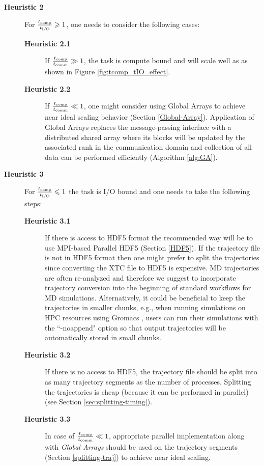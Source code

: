 \begin{description}
\item[\textbf{Heuristic 2}] For $\frac{{t}_{\text{comp}}}{{t}_{\text{I/O}}} \geqslant 1$, one needs to consider the following cases: 
  \begin{description}
  \item[\textbf{Heuristic 2.1}] If $\frac{{t}_{\text{comp}}}{t_{\text{comm}}} \gg 1$, the task is compute bound and will scale well as as shown in Figure \ref{fig:tcomp_tIO_effect}.
  \item[\textbf{Heuristic 2.2}] If $\frac{{t}_{\text{comp}}}{t_{\text{comm}}} \ll 1$, one might consider using Global Arrays to achieve near ideal scaling behavior (Section \ref{Global-Array}).  Application of Global Arrays replaces the message-passing interface with a distributed shared array where its blocks will be updated by the associated rank in the communication domain and collection of all data can be performed efficiently (Algorithm \ref{alg:GA}).
  \end{description}
\item[\textbf{Heuristic 3}] For $\frac{{t}_{\text{comp}}}{{t}_{\text{I/O}}} \leqslant 1$ the task is I/O bound and one needs to take the following steps:  
  \begin{description}
    \item[\textbf{Heuristic 3.1}] If there is access to HDF5 format the recommended way will be to use MPI-based Parallel HDF5 (Section \ref{HDF5}). If the trajectory file is not in HDF5 format then one might prefer to split the trajectories since converting the XTC file to HDF5 is expensive. MD trajectories are often re-analyzed and therefore we suggest to incorporate trajectory conversion into the beginning of standard workflows for MD simulations. 
 Alternatively, it could be beneficial to keep the trajectories in smaller chunks, e.g., when running simulations on HPC resources using Gromacs \cite{Gromacs3, Gromacs1}, users can run their simulations with the ``-noappend" option so that output trajectories  will be automatically stored in small chunks.
    \item[\textbf{Heuristic 3.2}] If there is no access to HDF5, the trajectory file should be split into as many trajectory segments as the number of processes. Splitting the trajectories is cheap (because it can be performed in parallel) (see Section \ref{sec:splitting-timing}).
    \item[\textbf{Heuristic 3.3}] In case of $\frac{{t}_{\text{comp}}}{t_{\text{comm}}} \ll 1$, appropriate parallel implementation along with \emph{Global Arrays} should be used on the trajectory segments (Section \ref{splitting-traj}) to achieve near ideal scaling.
  \end{description}
\end{description}
